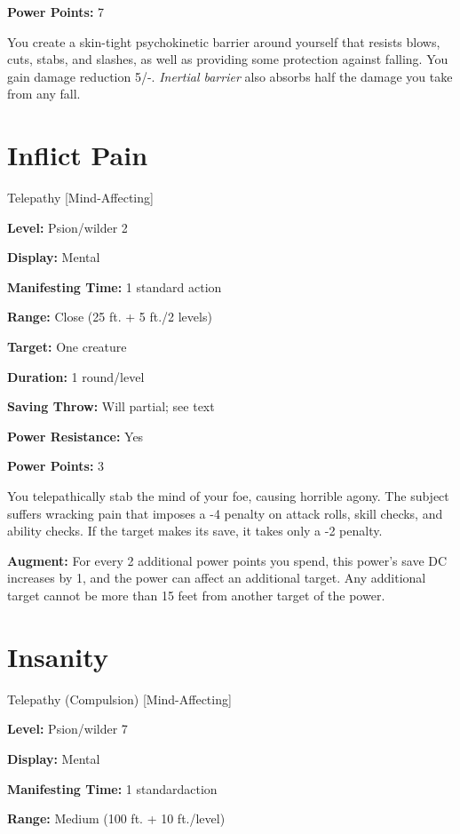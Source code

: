 \documentclass{article}
\begin{document}
\textbf{Power Points:} 7

You create a skin-tight psychokinetic barrier around yourself that resists blows, 
cuts, stabs, and slashes, as well as providing some protection against falling. 
You gain damage reduction 5/-. \textit{Inertial barrier }also absorbs half the 
damage you take from any fall.

\vspace{12pt}
\section*{Inflict Pain}

Telepathy [Mind-Affecting]

\textbf{Level:} Psion/wilder 2

\textbf{Display:} Mental

\textbf{Manifesting Time:} 1 standard action

\textbf{Range:} Close (25 ft. + 5 ft./2 levels)

\textbf{Target:} One creature

\textbf{Duration:} 1 round/level

\textbf{Saving Throw:} Will partial; see text

\textbf{Power Resistance:} Yes

\textbf{Power Points:} 3

You telepathically stab the mind of your foe, causing horrible agony. The subject 
suffers wracking pain that imposes a -4 penalty on attack rolls, skill checks, 
and ability checks. If the target makes its save, it takes only a -2 penalty.

\textbf{Augment:} For every 2 additional power points you spend, this power's save 
DC increases by 1, and the power can affect an additional target. Any additional 
target cannot be more than 15 feet from another target of the power.

\vspace{12pt}
\section*{Insanity}

Telepathy (Compulsion) [Mind-Affecting]

\textbf{Level:} Psion/wilder 7

\textbf{Display:} Mental

\textbf{Manifesting Time:} 1 standardaction

\textbf{Range:} Medium (100 ft. + 10 ft./level)
\end{document}
